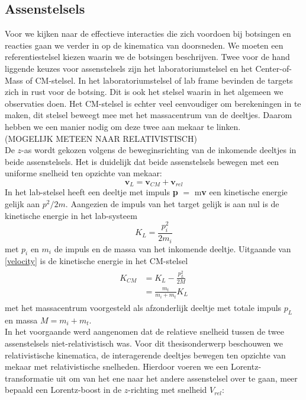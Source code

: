 \documentclass[11pt]{article}
\numberwithin{equation}{section}
\begin{document}
\subsection{Assenstelsels}\label{sec:Assenstelsels}
Voor we kijken naar de effectieve interacties die zich voordoen bij botsingen en reacties gaan we verder in op de kinematica van doorsneden. We moeten een referentiestelsel kiezen waarin we de botsingen beschrijven. Twee voor de hand liggende keuzes voor assenstelsels zijn het laboratoriumstelsel en het Center-of-Mass of CM-stelsel. In het laboratoriumstelsel of lab frame bevinden de targets zich in rust voor de botsing. Dit is ook het stelsel waarin in het algemeen we observaties doen. Het CM-stelsel is echter veel eenvoudiger om berekeningen in te maken, dit stelsel beweegt mee met het massacentrum van de deeltjes. Daarom hebben we een manier nodig om deze twee aan mekaar te linken. \\ (MOGELIJK METEEN NAAR RELATIVISTISCH)\\
De $z$-as wordt gekozen volgens de beweginsrichting van de inkomende deeltjes in beide assenstelsels. Het is duidelijk dat beide assenstelsels bewegen met een uniforme snelheid ten opzichte van mekaar:
\begin{equation}\label{velocity}
\mathbf{v}_L = \mathbf{v}_{CM} + \mathbf{v}_{rel}	
\end{equation}
 In het lab-stelsel heeft een deeltje met impuls \textbf{p} $=$ m\textbf{v} een kinetische energie gelijk aan $p^2/2m$. Aangezien de impuls van het target gelijk is aan nul is de kinetische energie in het lab-systeem
\begin{equation*}
K_L = \frac{p_i^2}{2m_i}	
\end{equation*}
met $p_i$ en $m_i$ de impuls en de massa van het inkomende deeltje. Uitgaande van \eqref{velocity} is de kinetische energie in het CM-stelsel 
\begin{align}
\begin{split}
	K_{CM} &= K_L - \frac{p_L^2}{2M}\\
	&= \frac{m_t}{m_i + m_t}K_L
\end{split}
\end{align}
met het massacentrum voorgesteld als afzonderlijk deeltje met totale impuls $p_L$ en massa $M = m_i + m_t$.\\
In het voorgaande werd aangenomen dat de relatieve snelheid tussen de twee assenstelsels niet-relativistisch was. Voor dit thesisonderwerp beschouwen we relativistische kinematica, de interagerende deeltjes bewegen ten opzichte van mekaar met relativistische snelheden. Hierdoor voeren we een Lorentz-transformatie uit om van het ene naar het andere assenstelsel over te gaan, meer bepaald een Lorentz-boost in de $z$-richting met snelheid $V_{rel}$:\\ \\
\end{document}
